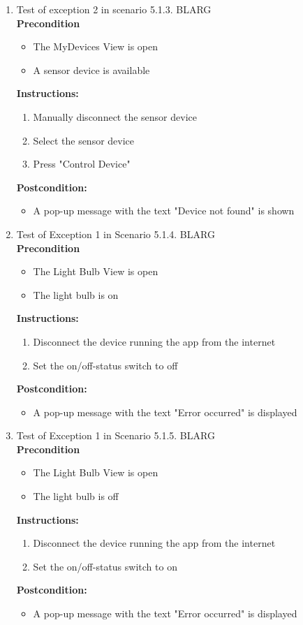 \documentclass[a4paper]{article}
\newlength{\testlabellength}
\newenvironment{testlist}{\begin{enumerate}[label=\bfseries Instruction \thesubsection.\arabic* , labelindent=0pt, labelwidth=\testlabellength , leftmargin=2cm]}{\end{enumerate}}
\newenvironment{precondition}{
{\color{white}BLARG}\\ 
\textbf{Precondition}
\begin{itemize}[labelindent=0cm, labelwidth=2cm , leftmargin=1cm]
}
{\end{itemize}}
\newenvironment{instruction}{
\textbf{Instructions:}
\begin{enumerate}[label=\bfseries  \arabic*., labelindent=0cm, labelwidth=2cm , leftmargin=1cm]
}
{\end{enumerate}}
\newenvironment{postcondition}{
\textbf{Postcondition:}
\begin{itemize}[labelindent=0cm, labelwidth=2cm , leftmargin=1cm]
}
{\end{itemize}}
\begin{document}
\begin{appendices}
\begin{testlist}
	\item Test of exception 2 in scenario 5.1.3. 
		\begin{precondition}
			\item The MyDevices View is open
			\item A sensor device is available
		\end{precondition}
		\begin{instruction}
			\item Manually disconnect the sensor device
			\item Select the sensor device
			\item Press "Control Device"
		\end{instruction}
		\begin{postcondition}
			\item A pop-up message with the text "Device not found" is shown
		\end{postcondition}

	\item  Test of Exception 1 in Scenario 5.1.4.
		\begin{precondition}
			\item The Light Bulb View is open
			\item The light bulb is on
		\end{precondition}
		\begin{instruction}
			\item Disconnect the device running the app from the internet
			\item Set the on/off-status switch to off
		\end{instruction}
		\begin{postcondition}
			\item A pop-up message with the text "Error occurred" is displayed 
		\end{postcondition}
	
	\item  Test of Exception 1 in Scenario 5.1.5.
		\begin{precondition}
			\item The Light Bulb View is open
			\item The light bulb is off
		\end{precondition}
		\begin{instruction}
			\item Disconnect the device running the app from the internet
			\item Set the on/off-status switch to on
		\end{instruction}
		\begin{postcondition}
			\item A pop-up message with the text "Error occurred" is displayed
		\end{postcondition}	
	

\end{testlist}
\end{appendices}
\end{document}
